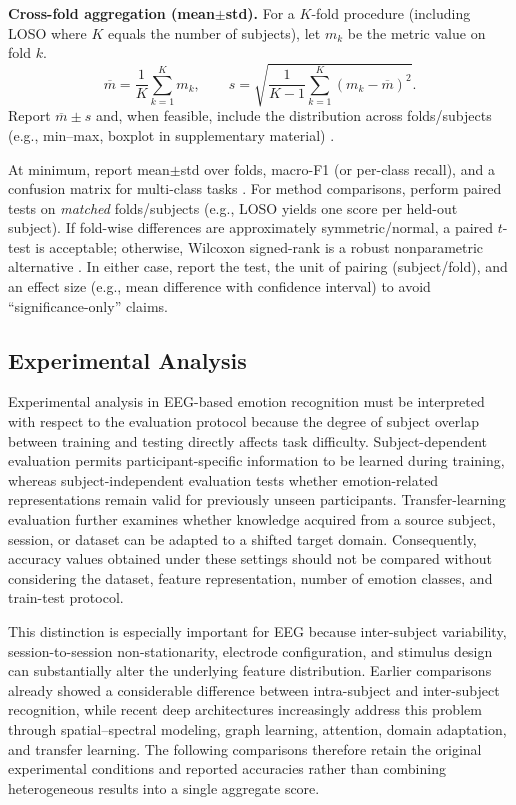\documentclass{WileyMSP-template}
\begin{document}
\textbf{Cross-fold aggregation (mean$\pm$std).}
For a $K$-fold procedure (including LOSO where $K$ equals the number of subjects), let $m_k$ be the metric value on fold $k$.
\begin{equation}
\overline{m}=\frac{1}{K}\sum_{k=1}^{K} m_k, \qquad
s=\sqrt{\frac{1}{K-1}\sum_{k=1}^{K}\left(m_k-\overline{m}\right)^2}.
\label{eq:mean_std}
\end{equation}
Report $\overline{m}\pm s$ and, when feasible, include the distribution across folds/subjects (e.g., min--max, boxplot in supplementary material) \cite{kukhilava2025evaluation}.


At minimum, report mean$\pm$std over folds, macro-F1 (or per-class recall), and a confusion matrix for multi-class tasks \cite{kukhilava2025evaluation,PeerJCS2065}. For method comparisons, perform paired tests on \emph{matched} folds/subjects (e.g., LOSO yields one score per held-out subject). If fold-wise differences are approximately symmetric/normal, a paired $t$-test is acceptable; otherwise, Wilcoxon signed-rank is a robust nonparametric alternative \cite{Demsar2006}. In either case, report the test, the unit of pairing (subject/fold), and an effect size (e.g., mean difference with confidence interval) to avoid ``significance-only'' claims.



\subsection{Experimental Analysis}
\label{subsec:experimental_analysis}

Experimental analysis in EEG-based emotion recognition must be interpreted with respect to the evaluation protocol because the degree of subject overlap between training and testing directly affects task difficulty. Subject-dependent evaluation permits participant-specific information to be learned during training, whereas subject-independent evaluation tests whether emotion-related representations remain valid for previously unseen participants. Transfer-learning evaluation further examines whether knowledge acquired from a source subject, session, or dataset can be adapted to a shifted target domain. Consequently, accuracy values obtained under these settings should not be compared without considering the dataset, feature representation, number of emotion classes, and train-test protocol.

This distinction is especially important for EEG because inter-subject variability, session-to-session non-stationarity, electrode configuration, and stimulus design can substantially alter the underlying feature distribution. Earlier comparisons already showed a considerable difference between intra-subject and inter-subject recognition, while recent deep architectures increasingly address this problem through spatial--spectral modeling, graph learning, attention, domain adaptation, and transfer learning. The following comparisons therefore retain the original experimental conditions and reported accuracies rather than combining heterogeneous results into a single aggregate score.
\end{document}
